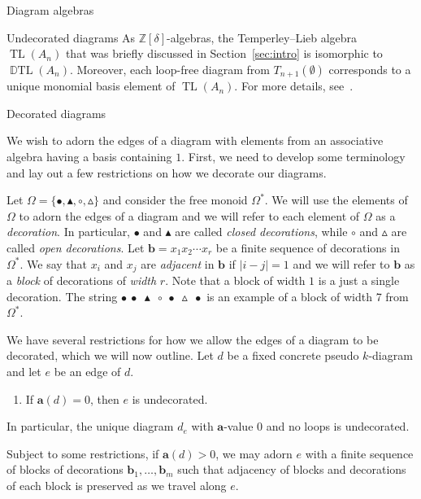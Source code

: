 \documentclass[11pt]{amsart}
\theoremstyle{definition}
\numberwithin{equation}{section}
\newcommand{\Z}{\mathbb{Z}}
\newcommand{\wtri}{\vartriangle}
\newcommand{\btri}{\blacktriangle}
\renewcommand{\a}{\mathbf{a}}
\DeclareMathOperator{\TL}{TL}
\DeclareMathOperator{\DTL}{\mathbb{D}TL}
\newcommand{\wcirc}{\circ}
\newcommand{\bcirc}{\bullet}
\renewcommand{\(}{\left(}
\renewcommand{\)}{\right)}
\begin{document}
\begin{section}{Diagram algebras}
\begin{subsection}{Undecorated diagrams}
As $\Z[\delta]$-algebras, the Temperley--Lieb algebra $\TL(A_{n})$ that was briefly discussed in Section~\ref{sec:intro} is isomorphic to $\DTL(A_{n})$.  Moreover, each loop-free diagram from $T_{n+1}(\emptyset)$ corresponds to a unique monomial basis element of $\TL(A_{n})$.  For more details, see~\cite{Kauffman1987,Penrose1971}.

\end{subsection}


\begin{subsection}{Decorated diagrams}

We wish to adorn the edges of a diagram with elements from an associative algebra having a basis containing $1$.  First, we need to develop some terminology and lay out a few restrictions on how we decorate our diagrams.

Let $\Omega=\{\bcirc, \btri, \wcirc, \wtri\}$ and consider the free monoid $\Omega^{*}$.  We will use the elements of $\Omega$ to adorn the edges of a diagram and we will refer to each element of $\Omega$ as a \emph{decoration}.  In particular, $\bcirc$ and $\btri$ are called \emph{closed decorations}, while $\wcirc$ and $\wtri$ are called \emph{open decorations}.   Let $\mathbf{b}=x_{1}x_{2}\cdots x_{r}$ be a finite sequence of decorations in $\Omega^{*}$.  We say that $x_{i}$ and $x_{j}$ are \emph{adjacent} in $\mathbf{b}$ if $|i-j|=1$ and we will refer to $\mathbf{b}$ as a \emph{block} of decorations of \emph{width} $r$.  Note that a block of width $1$ is a just a single decoration.  The string $\bcirc~\bcirc~\btri~\wcirc~\bcirc~\wtri~\bcirc$ is an example of a block of width 7 from $\Omega^*$.

We have several restrictions for how we allow the edges of a diagram to be decorated, which we will now outline.  Let $d$ be a fixed concrete pseudo $k$-diagram and let $e$ be an edge of $d$.

\begin{enumerate}[label=\rm{(D0)}]

\item \label{D0} If $\a(d)=0$, then $e$ is undecorated.

\end{enumerate}
In particular, the unique diagram $d_{e}$ with $\a$-value 0 and no loops is undecorated.

Subject to some restrictions, if $\a(d)>0$, we may adorn $e$ with a finite sequence of blocks of decorations $\mathbf{b}_{1}, \dots, \mathbf{b}_{m}$ such that adjacency of blocks and decorations of each block is preserved as we travel along $e$.  


\end{subsection}
\end{section}
\end{document}
